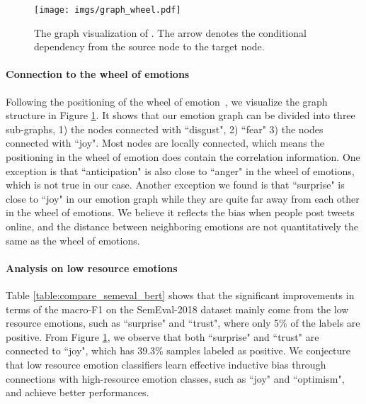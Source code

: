 \documentclass[11pt,a4paper]{article}
\begin{document}
\begin{figure}[!ht]
    \centering
    \texttt{[image: imgs/graph\_wheel.pdf]}
    \caption{The graph visualization of . The arrow denotes the conditional dependency from the source node to the target node.}
    \label{fig:graph-wheel}
\end{figure}

\paragraph{Connection to the wheel of emotions}
Following the positioning of the wheel of emotion~\cite{plutchik1984emotions}, we visualize the graph structure  in Figure \ref{fig:graph-wheel}. It shows that our emotion graph can be divided into three sub-graphs, 1) the nodes connected with ``disgust", 2) ``fear" 3) the nodes connected with ``joy". Most nodes are locally connected, which means the positioning in the wheel of emotion does contain the correlation information. One exception is that ``anticipation" is also close to ``anger" in the wheel of emotions, which is not true in our case. Another exception we found is that ``surprise" is close to ``joy" in our emotion graph while they are quite far away from each other in the wheel of emotions. We believe it reflects the bias when people post tweets online, and the distance between neighboring emotions are not quantitatively the same as the wheel of emotions. 

\paragraph{Analysis on low resource emotions} Table \ref{table:compare_semeval_bert} shows that the significant improvements in terms of the macro-F1 on the SemEval-2018 dataset mainly come from the low resource emotions, such as ``surprise" and ``trust", where only 5\% of the labels are positive. From Figure \ref{fig:graph-wheel}, we observe that both ``surprise" and ``trust" are connected to ``joy", which has 39.3\% samples labeled as positive. We conjecture that low resource emotion classifiers learn effective inductive bias through connections with high-resource emotion classes, such as ``joy" and ``optimism", and achieve better performances. 
\end{document}
